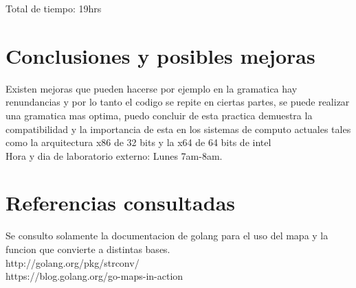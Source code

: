 \documentclass[10pt,letterpaper,oneside]{article}
\begin{document}
Total de tiempo: 19hrs

\section{Conclusiones y posibles mejoras}
Existen mejoras que pueden hacerse por ejemplo en la gramatica hay renundancias y por lo tanto el codigo se repite en ciertas partes, se puede realizar una gramatica mas optima, puedo concluir de esta practica demuestra la compatibilidad y la importancia de esta en los sistemas de computo actuales tales como la arquitectura x86 de 32 bits y la x64 de 64 bits de intel \\
Hora y dia de laboratorio externo: Lunes 7am-8am. 

\section{Referencias consultadas}
Se consulto solamente la documentacion de golang para el uso del mapa y la funcion que convierte a distintas bases. \\
http://golang.org/pkg/strconv/   \\
https://blog.golang.org/go-maps-in-action
\end{document}
